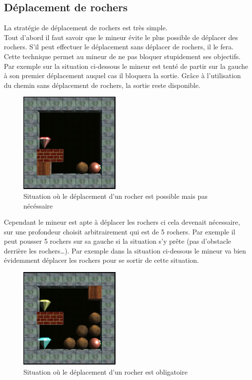 \documentclass[a4paper,11pt]{article}
\begin{document}
	\newpage
	\subsection{Déplacement de rochers}
	
La stratégie de déplacement de rochers est très simple.\\
Tout d’abord il faut savoir que le mineur évite le plus possible de déplacer des rochers. S’il peut effectuer le déplacement sans déplacer de rochers, il le fera. Cette technique permet au mineur de ne pas bloquer stupidement ses objectifs. Par exemple sur la situation ci-dessous le mineur est tenté de partir sur la gauche à son premier déplacement auquel cas il bloquera la sortie. Grâce à l’utilisation du chemin sans déplacement de rochers, la sortie reste disponible.

		\begin{figure}[h]
			\center
			\includegraphics[width=5cm]{rochers1}
			\caption{\label{deplacementRocher1} Situation où le déplacement d'un rocher est possible mais pas nécéssaire}
		\end{figure}
		
Cependant le mineur est apte à déplacer les rochers ci cela devenait nécessaire, sur une profondeur choisit arbitrairement qui est de 5 rochers. Par exemple il peut pousser 5 rochers sur sa gauche si la situation s’y prête (pas d’obstacle derrière les rochers…). Par exemple dans la situation ci-dessous le mineur va bien évidemment déplacer les rochers pour se sortir de cette situation.

		\begin{figure}[h]
			\center
			\includegraphics[width=5cm]{rochers2}
			\caption{\label{deplacementRocher2} Situation où le déplacement d'un rocher est obligatoire}
		\end{figure}
		
\end{document}
